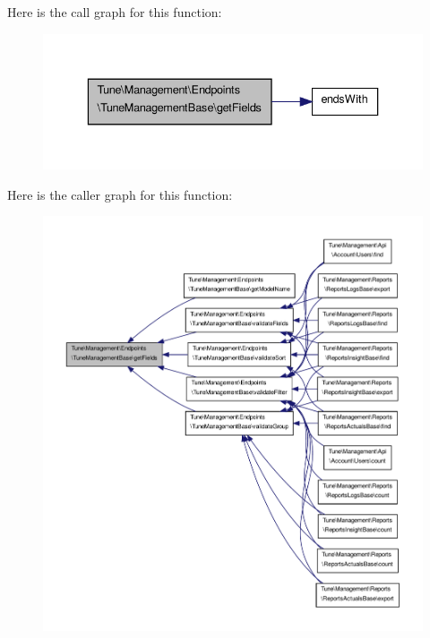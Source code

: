 Here is the call graph for this function\-:
\nopagebreak
\begin{figure}[H]
\begin{center}
\leavevmode
\includegraphics[width=336pt]{classTune_1_1Management_1_1Endpoints_1_1TuneManagementBase_a90622e8a1a2e1838e83d3c5f1295e92b_cgraph}
\end{center}
\end{figure}




Here is the caller graph for this function\-:
\nopagebreak
\begin{figure}[H]
\begin{center}
\leavevmode
\includegraphics[width=350pt]{classTune_1_1Management_1_1Endpoints_1_1TuneManagementBase_a90622e8a1a2e1838e83d3c5f1295e92b_icgraph}
\end{center}
\end{figure}


